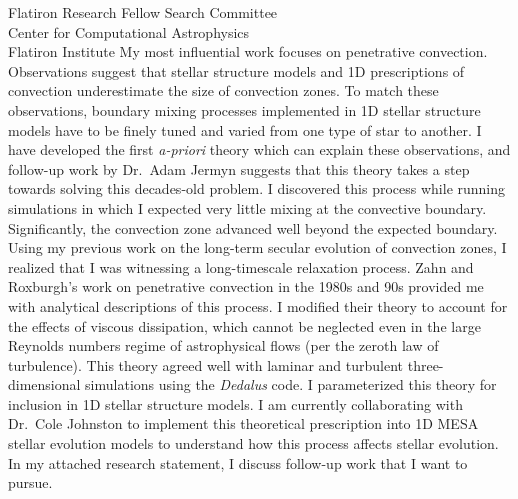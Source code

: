 \documentclass[12pt]{letter}
\begin{document}
\begin{letter}{
               Flatiron Research Fellow Search Committee \\
               Center for Computational Astrophysics \\
               Flatiron Institute 
           }
    My most influential work focuses on penetrative convection.
    Observations suggest that stellar structure models and 1D prescriptions of convection underestimate the size of convection zones.
    To match these observations, boundary mixing processes implemented in 1D stellar structure models have to be finely tuned and varied from one type of star to another.
    I have developed the first \emph{a-priori} theory which can explain these observations, and follow-up work by Dr.~Adam Jermyn suggests that this theory takes a step towards solving this decades-old problem.
    I discovered this process while running simulations in which I expected very little mixing at the convective boundary.
    Significantly, the convection zone advanced well beyond the expected boundary.
    Using my previous work on the long-term secular evolution of convection zones, I realized that I was witnessing a long-timescale relaxation process.
    Zahn and Roxburgh's work on penetrative convection in the 1980s and 90s provided me with analytical descriptions of this process.
    I modified their theory to account for the effects of viscous dissipation, which cannot be neglected even in the large Reynolds numbers regime of astrophysical flows (per the zeroth law of turbulence).
    This theory agreed well with laminar and turbulent three-dimensional simulations using the \emph{Dedalus} code.
    I parameterized this theory for inclusion in 1D stellar structure models.
    I am currently collaborating with Dr.~Cole Johnston to implement this theoretical prescription into 1D MESA stellar evolution models to understand how this process affects stellar evolution.
    In my attached research statement, I discuss follow-up work that I want to pursue.


\end{letter}
\end{document}
